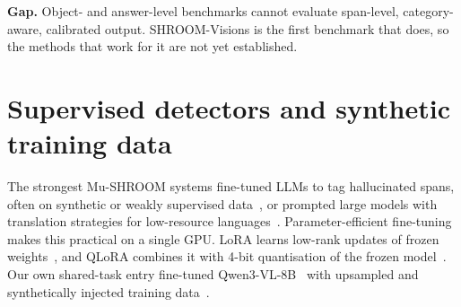 \textbf{Gap.} Object- and answer-level benchmarks cannot evaluate span-level, category-aware, calibrated output. SHROOM-Visions is the first benchmark that does, so the methods that work for it are not yet established.

\section{Supervised detectors and synthetic training data}

The strongest Mu-SHROOM systems fine-tuned LLMs to tag hallucinated spans, often on synthetic or weakly supervised data~\cite{rykov-etal-2025-smurfcat,mo-etal-2025-team,kobus-etal-2025-atlantis}, or prompted large models with translation strategies for low-resource languages~\cite{karkani-etal-2025-ails}. Parameter-efficient fine-tuning makes this practical on a single GPU. LoRA learns low-rank updates of frozen weights~\cite{hu2022lora}, and QLoRA combines it with 4-bit quantisation of the frozen model~\cite{dettmers2023qlora}. Our own shared-task entry fine-tuned Qwen3-VL-8B~\cite{bai2025qwen3} with upsampled and synthetically injected training data~\cite{rattanajaratkul2026smurfcat}.


